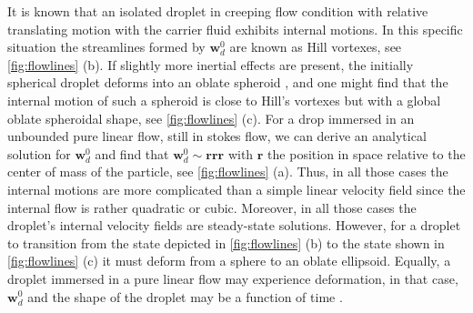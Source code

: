 It is known that an isolated droplet in creeping flow condition with relative translating motion with the carrier fluid exhibits internal motions. In this specific situation the streamlines formed by $\textbf{w}_d^0$ are known as Hill vortexes, see \ref{fig:flowlines} (b). 
If slightly more inertial effects are present, the initially spherical droplet deforms into an oblate spheroid \citep{taylor1964deformation}, and one might find that the internal motion of such a spheroid is close to Hill's vortexes but with a global oblate spheroidal shape, see \ref{fig:flowlines} (c). 
For a drop immersed in an unbounded pure linear flow, still in stokes flow, we can derive an analytical solution for $\textbf{w}_d^0$ and find that $\textbf{w}_d^0 \sim \textbf{rrr}$ with $\textbf{r}$ the position in space relative to the center of mass of the particle, see \ref{fig:flowlines} (a). 
Thus, in all those cases the internal motions are more complicated than a simple linear velocity field since the internal flow is rather quadratic or cubic. 
Moreover, in all those cases the droplet's internal velocity fields are steady-state solutions.
However, for a droplet to transition from the state depicted in \ref{fig:flowlines} (b) to the state shown in \ref{fig:flowlines} (c) it must deform from a sphere to an oblate ellipsoid. 
Equally, a droplet immersed in a pure linear flow may experience deformation, in that case, $\textbf{w}_d^0$ and the shape of the droplet may be a function of time \citet[chapter 7]{leal2007advanced}.
